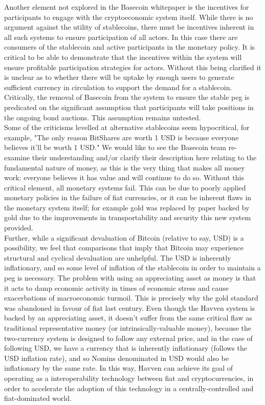 \documentclass{article}
\begin{document}
\noindent Another element not explored in the Basecoin whitepaper is the incentives for participants to engage with the cryptoeconomic system itself. While there is no argument against the utility of stablecoins, there must be incentives inherent in all such systems to ensure participation of all actors. In this case there are consumers of the stablecoin and active participants in the monetary policy. It is critical to be able to demonstrate that the incentives within the system will ensure profitable participation strategies for actors. Without this being clarified it is unclear as to whether there will be uptake by enough users to generate sufficient currency in circulation to support the demand for a stablecoin. Critically, the removal of Basecoin from the system to ensure the stable peg is predicated on the significant assumption that participants will take positions in the ongoing bond auctions. This assumption remains untested. \\
				
\noindent Some of the criticisms levelled at alternative stablecoins seem hypocritical, for example, "The only reason BitShares are worth 1 USD is because everyone believes it’ll be worth 1 USD." We would like to see the Basecoin team re-examine their understanding and/or clarify their description here relating to the fundamental nature of money, as this is the very thing that makes all money work: everyone believes it has value and will continue to do so. Without this critical element, all monetary systems fail. This can be due to poorly applied monetary policies in the failure of fiat currencies, or it can be inherent flaws in the monetary system itself; for example gold was replaced by paper backed by gold due to the improvements in transportability and security this new system provided. \\
				
\noindent Further, while a significant devaluation of Bitcoin (relative to say, USD) is a possibility, we feel that comparisons that imply that Bitcoin may experience structural and cyclical devaluation are unhelpful. The USD is inherently inflationary, and so some level of inflation of the stablecoin in order to maintain a peg is necessary. The problem with using an appreciating asset as money is that it acts to damp economic activity in times of economic stress and cause exacerbations of macroeconomic turmoil. This is precisely why the gold standard was abandoned in favour of fiat last century. Even though the Havven system is backed by an appreciating asset, it doesn't suffer from the same critical flaw as traditional representative money (or intrinsically-valuable money), because the two-currency system is designed to follow any external price, and in the case of following USD, we have a currency that is inherently inflationary (follows the USD inflation rate), and so Nomins denominated in USD would also be inflationary by the same rate. In this way, Havven can achieve its goal of operating as a interoperability technology between fiat and cryptocurrencies, in order to accelerate the adoption of this technology in a centrally-controlled and fiat-dominated world. \\
\end{document}

